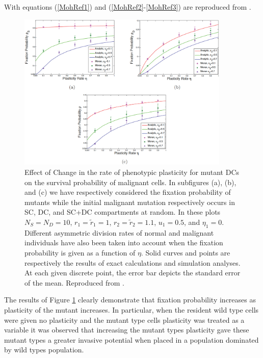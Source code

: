 \documentclass[12pt]{article}
\begin{document}
With equations (\ref{MohRef1}) and (\ref{MohRef2}-\ref{MohRef3}) are reproduced from \cite{mohammad}.

\begin{figure}[H]
\begin{center}
\includegraphics[width=0.9\textwidth]{moh_fig5.png}
\end{center}
\caption{Effect of Change in the rate of phenotypic plasticity for mutant DCs on the survival probability of malignant cells. In subfigures (a), (b), and (c) we have respectively considered the fixation probability of mutants while the initial malignant mutation respectively occurs in SC, DC, and SC+DC compartments at random. In these plots $N_S=N_D=10$, $r_1=\tilde{r}_1=1$, $r_2=\tilde{r}_2=1.1$, $u_1=0.5$, and $\eta_1=0$. Different asymmetric division rates of normal and malignant individuals have also been taken into account when the fixation probability is given as a function of $\eta$. Solid curves and points are respectively the results of exact calculations and simulation analyses. At each given discrete point, the error bar depicts the standard error of the mean. Reproduced from \cite{mohammad}.}\label{MohFig5}
\end{figure}

The results of Figure \ref{MohFig5} clearly demonstrate that fixation probability increases as plasticity of the mutant increases. In particular, when the resident wild type cells were given no plasticity and the mutant type cells plasticity was treated as a variable it was observed that increasing the mutant types plasticity gave these mutant types a greater invasive potential when placed in a population dominated by wild types population.
\end{document}
